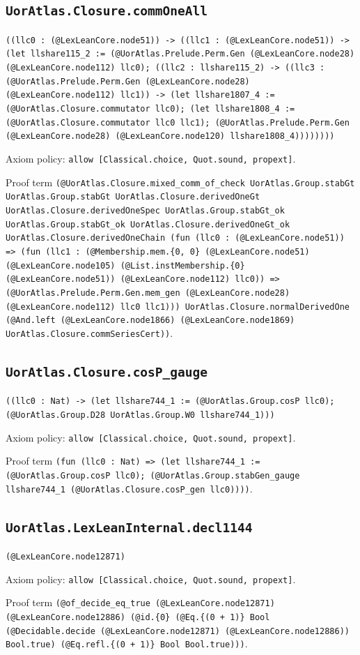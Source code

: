 \documentclass[11pt]{article}
\begin{document}
\subsection*{\texttt{UorAtlas.Closure.commOneAll}}
\noindent\texttt{((llc0 : (@LexLeanCore.node51)) -> ((llc1 : (@LexLeanCore.node51)) -> (let llshare115\_2 := (@UorAtlas.Prelude.Perm.Gen (@LexLeanCore.node28) (@LexLeanCore.node112) llc0); ((llc2 : llshare115\_2) -> ((llc3 : (@UorAtlas.Prelude.Perm.Gen (@LexLeanCore.node28) (@LexLeanCore.node112) llc1)) -> (let llshare1807\_4 := (@UorAtlas.Closure.commutator llc0); (let llshare1808\_4 := (@UorAtlas.Closure.commutator llc0 llc1); (@UorAtlas.Prelude.Perm.Gen (@LexLeanCore.node28) (@LexLeanCore.node120) llshare1808\_4))))))))}\par
\noindent Axiom policy: \texttt{allow [Classical.choice, Quot.sound, propext]}.\par
\noindent Proof term \texttt{(@UorAtlas.Closure.mixed\_comm\_of\_check UorAtlas.Group.stabGt UorAtlas.Group.stabGt UorAtlas.Closure.derivedOneGt UorAtlas.Closure.derivedOneSpec UorAtlas.Group.stabGt\_ok UorAtlas.Group.stabGt\_ok UorAtlas.Closure.derivedOneGt\_ok UorAtlas.Closure.derivedOneChain (fun (llc0 : (@LexLeanCore.node51)) => (fun (llc1 : (@Membership.mem.\{0, 0\} (@LexLeanCore.node51) (@LexLeanCore.node105) (@List.instMembership.\{0\} (@LexLeanCore.node51)) (@LexLeanCore.node112) llc0)) => (@UorAtlas.Prelude.Perm.Gen.mem\_gen (@LexLeanCore.node28) (@LexLeanCore.node112) llc0 llc1))) UorAtlas.Closure.normalDerivedOne (@And.left (@LexLeanCore.node1866) (@LexLeanCore.node1869) UorAtlas.Closure.commSeriesCert))}.\par
\subsection*{\texttt{UorAtlas.Closure.cosP\_gauge}}
\noindent\texttt{((llc0 : Nat) -> (let llshare744\_1 := (@UorAtlas.Group.cosP llc0); (@UorAtlas.Group.D28 UorAtlas.Group.W0 llshare744\_1)))}\par
\noindent Axiom policy: \texttt{allow [Classical.choice, Quot.sound, propext]}.\par
\noindent Proof term \texttt{(fun (llc0 : Nat) => (let llshare744\_1 := (@UorAtlas.Group.cosP llc0); (@UorAtlas.Group.stabGen\_gauge llshare744\_1 (@UorAtlas.Closure.cosP\_gen llc0))))}.\par
\subsection*{\texttt{UorAtlas.LexLeanInternal.decl1144}}
\noindent\texttt{(@LexLeanCore.node12871)}\par
\noindent Axiom policy: \texttt{allow [Classical.choice, Quot.sound, propext]}.\par
\noindent Proof term \texttt{(@of\_decide\_eq\_true (@LexLeanCore.node12871) (@LexLeanCore.node12886) (@id.\{0\} (@Eq.\{(0 + 1)\} Bool (@Decidable.decide (@LexLeanCore.node12871) (@LexLeanCore.node12886)) Bool.true) (@Eq.refl.\{(0 + 1)\} Bool Bool.true)))}.\par
\end{document}
